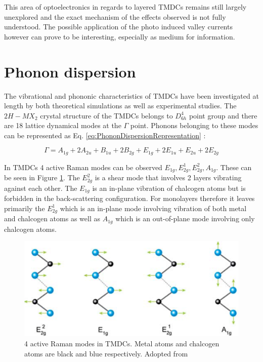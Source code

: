 This area of optoelectronics in regards to layered TMDCs remains still largely unexplored and the exact mechanism of the effects observed is not fully understood. The possible application of the photo induced valley currents however can prove to be interesting, especially as medium for information.

\section{Phonon dispersion}
	
The vibrational and phononic characteristics of TMDCs have been investigated at length by both theoretical simulations as well as experimental studies. The $2H-MX_2$ crystal structure of the TMDCs belongs to $D_{6h}^4$ point group and there are 18 lattice dynamical modes at the $\Gamma$ point. Phonons belonging to these modes can be represented as Eq. \ref{eq:PhononDispersionRepresentation} \cite{LatticeDynamicsInMono-AndFew-LayerSheetsOfWS2AndWSe2}: 
	
\begin{equation}
	{\Gamma} = A_{1g} + 2A_{2u} + B_{1u} + 2B_{2g} + E_{1g} + 2E_{1u} + E_{2u} + 2E_{2g}
	\label{eq:PhononDispersionRepresentation} 
\end{equation}
	
In TMDCs 4 active Raman modes can be observed $E_{1g}, E^1_{2g}, E^2_{2g}, A_{1g}$. These can be seen in Figure \ref{fig:4ActiveRamanModes}. The $E^2_{2g}$ is a shear mode that involves 2 layers vibrating against each other. The $E_{1g}$ is an in-plane vibration of chalcogen atoms but is forbidden in the back-scattering configuration. For monolayers therefore it leaves primarily the $E^1_{2g}$ which is an in-plane mode involving vibration of both metal and chalcogen atoms as well as $A_{1g}$ which is an out-of-plane mode involving only chalcogen atoms. 
	
\begin{figure}[ht]
	\begin{center}
		\includegraphics[scale=0.2]{RamanActiveModes.png}
		\caption{4 active Raman modes in TMDCs. Metal atoms and chalcogen atoms are black and blue respectively. Adopted from \cite{LatticeDynamicsInMono-AndFew-LayerSheetsOfWS2AndWSe2}}
		\label{fig:4ActiveRamanModes}
	\end{center}
\end{figure}
	
